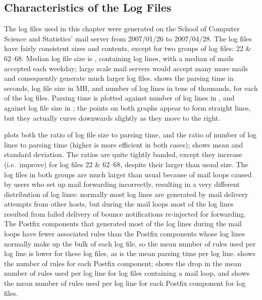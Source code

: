 \subsection{Characteristics of the \numberOFlogFILES{} Log Files}

\label{Characteristics of the 93 log files}

The \numberOFlogFILES{} log files used in this chapter were generated on
the School of Computer Science and Statistics' mail server from 2007/01/26
to 2007/04/28.  The \numberOFlogFILES{} log files have fairly consistent
sizes and contents, except for two groups of log files: 22 \& 62--68.
Median log file size is , containing
 log lines, with a median
of  mails accepted
each weekday; large scale mail servers would accept many more mails and
consequently generate much larger log files.   shows the parsing time in seconds,
log file size in MB, and number of log lines in tens of thousands, for each
of the \numberOFlogFILES{} log files.  Parsing time is plotted against
number of log lines in , and against log file size in ; the points on both graphs appear to form straight lines,
but they actually curve downwards slightly as they move to the right.

plots both the ratio of log file size to parsing time, and the ratio of
number of log lines to parsing time (higher is more efficient in both
cases);  shows mean and standard deviation.  The ratios are quite
tightly banded, except they increase (i.e.\ improve) for log files 22 \&
62--68, despite their larger than usual size.  The log files in both groups
are much larger than usual because of mail loops caused by users who set up
mail forwarding incorrectly, resulting in a very different distribution of
log lines: normally most log lines are generated by mail delivery attempts
from other hosts, but during the mail loops most of the log lines resulted
from failed delivery of bounce notifications re-injected for forwarding.
The Postfix components that generated most of the log lines during the mail
loops have fewer associated rules than the Postfix components whose log
lines normally make up the bulk of each log file, so the mean number of
rules used per log line is lower for these log files, as is the mean
parsing time per log line.   shows the number of rules for each Postfix component;
 shows the drop in the
mean number of rules used per log line for log files containing a mail
loop, and  shows the mean number of rules used per log line for each
Postfix component for \numberOFlogFILES{} log files.

